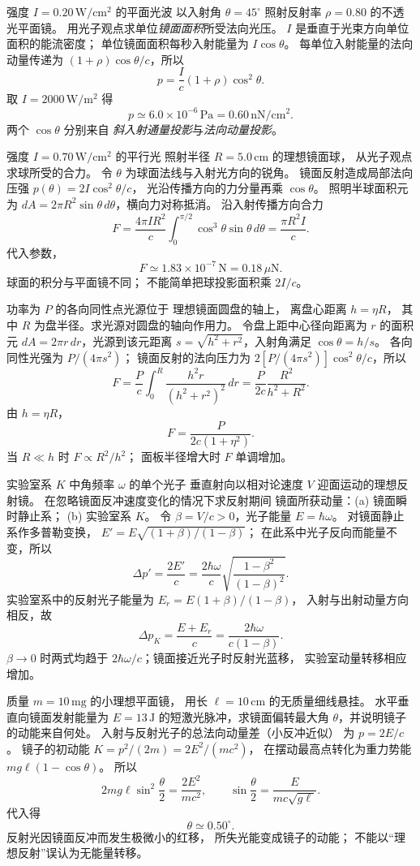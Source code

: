 强度 $I=0.20\,\mathrm{W/cm^2}$ 的平面光波
以入射角 $\theta=45^\circ$ 照射反射率
$\rho=0.80$ 的不透光平面镜。
用光子观点求单位\emph{镜面面积}所受法向光压。
\exsolution
$I$ 是垂直于光束方向单位面积的能流密度；
单位镜面面积每秒入射能量为 $I\cos\theta$。
每单位入射能量的法向动量传递为
$(1+\rho)\cos\theta/c$，所以
\[
 \boxed{p=\frac Ic(1+\rho)\cos^2\theta}.
\]
取 $I=2000\,\mathrm{W/m^2}$ 得
\[
 \boxed{p\simeq6.0\times10^{-6}\,\mathrm{Pa}
 =0.60\,\mathrm{nN/cm^2}}.
\]
\excheck 两个 $\cos\theta$ 分别来自
\emph{斜入射通量投影}与\emph{法向动量投影}。

强度 $I=0.70\,\mathrm{W/cm^2}$ 的平行光
照射半径 $R=5.0\,\mathrm{cm}$ 的理想镜面球，
从光子观点求球所受的合力。
\exsolution
令 $\theta$ 为球面法线与入射光方向的锐角。
镜面反射造成局部法向压强
$p(\theta)=2I\cos^2\theta/c$，
光沿传播方向的力分量再乘 $\cos\theta$。
照明半球面积元为
$dA=2\pi R^2\sin\theta\,d\theta$，横向力对称抵消。
沿入射传播方向合力
\[
 F=\frac{4\pi IR^2}{c}
 \int_0^{\pi/2}\cos^3\theta\sin\theta\,d\theta
 =\boxed{\frac{\pi R^2I}{c}}.
\]
代入参数，
\[
 \boxed{F\simeq1.83\times10^{-7}\,\mathrm N
 =0.18\,\mu\mathrm N}.
\]
\excheck 球面的积分与平面镜不同；
不能简单把球投影面积乘 $2I/c$。

功率为 $P$ 的各向同性点光源位于
理想镜面圆盘的轴上，
离盘心距离 $h=\eta R$，
其中 $R$ 为盘半径。求光源对圆盘的轴向作用力。
\exsolution
令盘上距中心径向距离为 $r$ 的面积元
$dA=2\pi r\,dr$，光源到该元距离
$s=\sqrt{h^2+r^2}$，入射角满足 $\cos\theta=h/s$。
各向同性光强为 $P/(4\pi s^2)$；
镜面反射的法向压力为
$2[P/(4\pi s^2)]\cos^2\theta/c$，所以
\[
 F=\frac{P}{c}\int_0^R
 \frac{h^2r}{(h^2+r^2)^2}\,dr
 =\frac{P}{2c}\frac{R^2}{h^2+R^2}.
\]
由 $h=\eta R$，
\[
 \boxed{F=\frac{P}{2c(1+\eta^2)}}.
\]
\excheck 当 $R\ll h$ 时 $F\propto R^2/h^2$；
面板半径增大时 $F$ 单调增加。

实验室系 $K$ 中角频率 $\omega$ 的单个光子
垂直射向以相对论速度 $V$ 迎面运动的理想反射镜。
在忽略镜面反冲速度变化的情况下求反射期间
镜面所获动量：(a) 镜面瞬时静止系；
(b) 实验室系 $K$。
\exsolution
令 $\beta=V/c>0$，光子能量 $E=\hbar\omega$。
对镜面静止系作多普勒变换，
$E'=E\sqrt{(1+\beta)/(1-\beta)}$；
在此系中光子反向而能量不变，所以
\[
 \boxed{\Delta p'=\frac{2E'}c
 =\frac{2\hbar\omega}{c}
 \sqrt{\frac{1-\beta^2}{(1-\beta)^2}}}.
\]
实验室系中的反射光子能量为
$E_r=E(1+\beta)/(1-\beta)$，
入射与出射动量方向相反，故
\[
 \boxed{\Delta p_K=\frac{E+E_r}{c}
 =\frac{2\hbar\omega}{c(1-\beta)}}.
\]
\excheck $\beta\to0$ 时两式均趋于
$2\hbar\omega/c$；镜面接近光子时反射光蓝移，
实验室动量转移相应增加。

质量 $m=10\,\mathrm{mg}$ 的小理想平面镜，
用长 $\ell=10\,\mathrm{cm}$ 的无质量细线悬挂。
水平垂直向镜面发射能量为 $E=13\,\mathrm J$
的短激光脉冲，求镜面偏转最大角
$\theta$，并说明镜子的动能来自何处。
\exsolution
入射与反射光子的总法向动量差（小反冲近似）
为 $p=2E/c$。
镜子的初动能
$K=p^2/(2m)=2E^2/(mc^2)$，
在摆动最高点转化为重力势能
$mg\ell(1-\cos\theta)$。
所以
\[
 2mg\ell\sin^2\frac\theta2
 =\frac{2E^2}{mc^2},\qquad
 \boxed{\sin\frac\theta2=\frac{E}{mc\sqrt{g\ell}}}.
\]
代入得
\[
 \boxed{\theta\simeq0.50^\circ}.
\]
\excheck 反射光因镜面反冲而发生极微小的红移，
所失光能变成镜子的动能；
不能以“理想反射”误认为无能量转移。
